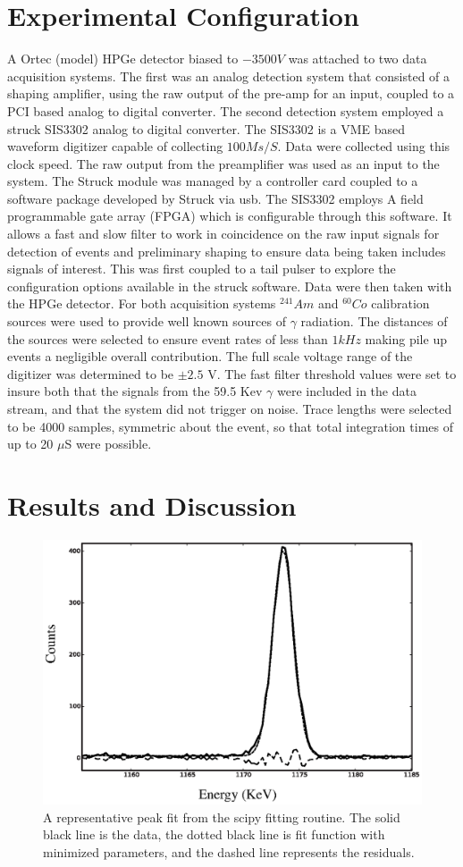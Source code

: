 \documentclass[twocolumn,preprintnumbers,superscriptaddress,amsmath,amssymb,floatfix]{revtex4-1}
\begin{document}
\section{Experimental Configuration}
\label{exp}
A Ortec (model) HPGe detector biased to $-3500 V$ was attached to two data acquisition systems. The first was an analog detection system that consisted of a shaping amplifier, using the raw output of the pre-amp for an input, coupled to a PCI based analog to digital converter.  The second detection system employed a struck SIS3302 analog to digital converter. The SIS3302 is a VME based waveform digitizer capable of collecting $100Ms/S$. Data were collected using this clock speed. The raw output from the preamplifier was used as an input to the system. The Struck module was managed by a controller card coupled to a software package developed by Struck via usb. The SIS3302 employs A field programmable gate array (FPGA) which is configurable through this software. It allows a fast and slow filter to work in coincidence on the raw input signals for detection of events and preliminary shaping to ensure data being taken includes signals of interest. This was first coupled to a  tail pulser to explore the configuration options available in the struck software. Data were then taken with the HPGe detector. For both acquisition systems $^{241}Am$ and $^{60}Co$ calibration sources were used to provide well known sources of $\gamma$ radiation. The distances of the sources were selected to ensure event rates of less than $1kHz$ making pile up events a negligible overall contribution. The full scale voltage range of the digitizer was determined to be $\pm 2.5$ V. The fast filter threshold values were set to insure both that the signals from the 59.5 Kev $\gamma$ were included in the data stream, and that the system did not trigger on noise. Trace lengths were selected to be 4000 samples, symmetric about the event, so that total integration times of up to 20 $\mu$S were possible.

\section{Results and Discussion}
\label{data}

\begin{figure}
\includegraphics[width=.5\textwidth]{peak_fit.eps}
\caption{A representative peak fit from the scipy fitting routine. The solid black line is the data, the dotted black line is fit function with minimized parameters, and the dashed line represents the residuals. 
\label{peak_fit}}
\end{figure}
\end{document}
